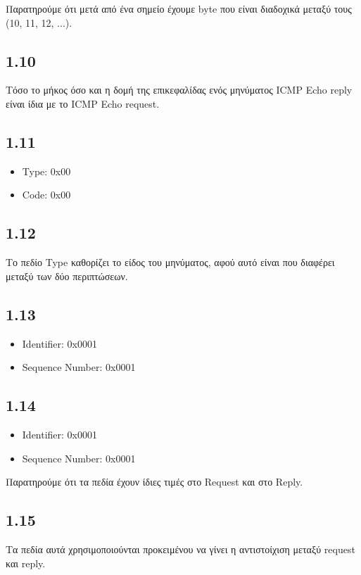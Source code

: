 			Παρατηρούμε ότι μετά από ένα σημείο έχουμε byte που είναι διαδοχικά μεταξύ τους (10, 11, 12, ...).
	
		\subsection*{1.10}
			Τόσο το μήκος όσο και η δομή της επικεφαλίδας ενός μηνύματος ICMP Echo reply είναι ίδια με το ICMP Echo request.  
	
		\subsection*{1.11}
			\begin{itemize}
				\item Type: 0x00
				\item Code: 0x00
			\end{itemize}
	
		\subsection*{1.12}
			Το πεδίο Type καθορίζει το είδος του μηνύματος, αφού αυτό είναι που διαφέρει μεταξύ των δύο περιπτώσεων.
	
		\subsection*{1.13}
			\begin{itemize}
				\item Identifier: 0x0001
				\item Sequence Number: 0x0001
			\end{itemize}
	
		\subsection*{1.14}
			\begin{itemize}
				\item Identifier: 0x0001
				\item Sequence Number: 0x0001
			\end{itemize}
		
			Παρατηρούμε ότι τα πεδία έχουν ίδιες τιμές στο Request και στο Reply.
	
		\subsection*{1.15}
			Τα πεδία αυτά χρησιμοποιούνται προκειμένου να γίνει η αντιστοίχιση μεταξύ request και reply.
	
